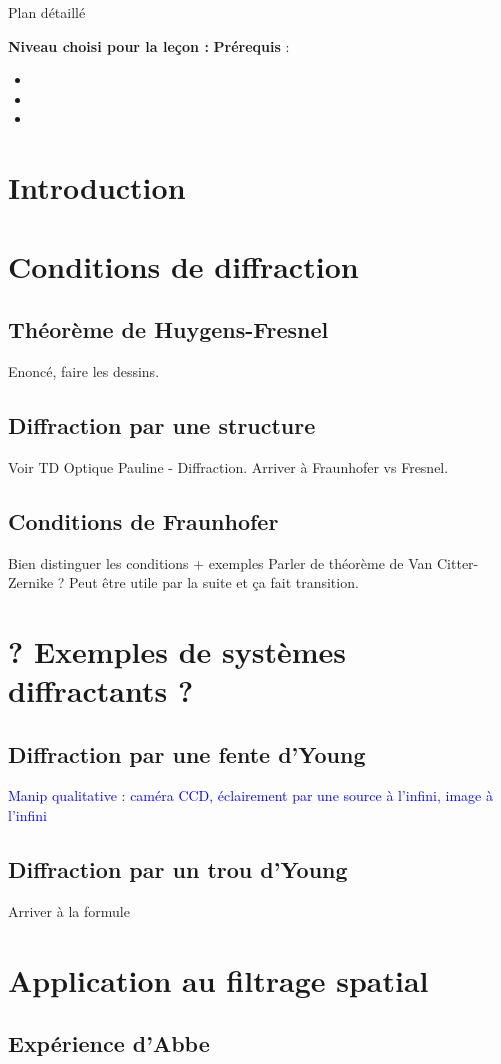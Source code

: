\begin{reportBlock}{Plan détaillé}

  \textbf{Niveau choisi pour la leçon :} 
  \newline
  \textbf{Prérequis} : \begin{itemize}
      \item 
      \item 
      \item 
  \end{itemize}
  
  \section*{Introduction}

  \section{Conditions de diffraction}

  \subsection{Théorème de Huygens-Fresnel} 
  Enoncé, faire les dessins.
  \subsection{Diffraction par une structure}
  Voir TD Optique Pauline - Diffraction. Arriver à Fraunhofer vs Fresnel. 

  \subsection{Conditions de Fraunhofer}
  Bien distinguer les conditions + exemples
  Parler de théorème de Van Citter-Zernike ? Peut être utile par la suite et ça fait transition.
  \section{? Exemples de systèmes diffractants ?}
  
  \subsection{Diffraction par une fente d'Young}
  \textcolor{blue}{Manip qualitative : caméra CCD, éclairement par une source à l'infini, image à l'infini }

  \subsection{Diffraction par un trou d'Young}
  Arriver à la formule
  
  \section{Application au filtrage spatial}

  \subsection{Expérience d'Abbe}


\end{reportBlock}